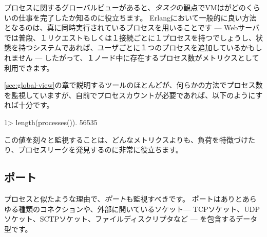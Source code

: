 プロセスに関するグローバルビューがあると、\emph{タスク}の観点でVMはがどのくらいの仕事を完了したか知るのに役立ちます。
Erlangにおいて一般的に良い方法となるのは、真に同時実行されているプロセスを用いることです --- Webサーバでは普段、１リクエストもしくは１接続ごとに１プロセスを持つでしょうし、状態を持つシステムであれば、ユーザごとに１つのプロセスを追加しているかもしれません --- したがって、１ノード中に存在するプロセス数がメトリクスとして利用できます。

\ref{sec:global-view}の章で説明するツールのほとんどが、何らかの方法でプロセス数を監視していますが、自前でプロセスカウントが必要であれば、以下のようにすれば十分です。

\begin{VerbatimEshell}
1> length(processes()).
56535
\end{VerbatimEshell}

この値を刻々と監視することは、どんなメトリクスよりも、負荷を特徴づけたり、プロセスリークを発見するのに非常に役立ちます。

\subsection{ポート}
\label{subsec:global-ports}

プロセスと似たような理由で、\emph{ポート}も監視すべきです。
ポートはありとあらゆる種類のコネクションや、外部に開いているソケット--- TCPソケット、UDPソケット、SCTPソケット、ファイルディスクリプタなど --- を包含するデータ型です。

